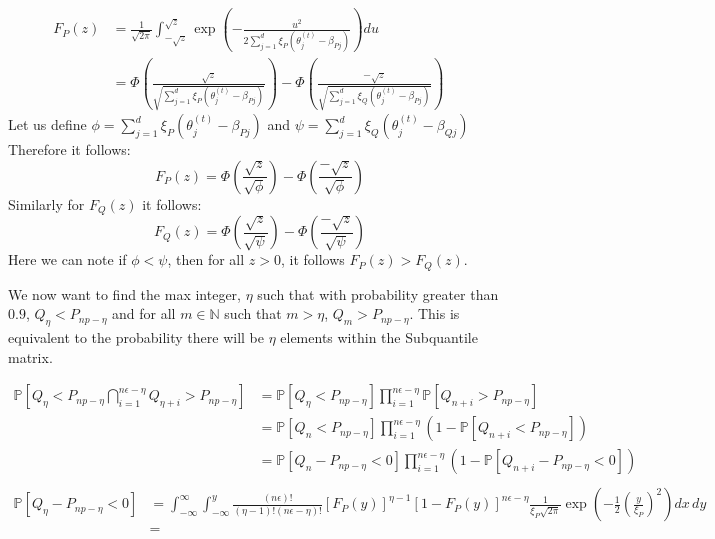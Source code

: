 \documentclass{article} %
\begin{document}
\begin{appendices}
	\begin{align}
		F_P(z) &= \frac{1}{\sqrt{2\pi}}\int_{-\sqrt{z}}^{\sqrt{z}}\exp\left(-\frac{u^2}{2\sum_{j=1}^d \xi_P\left(\theta_j^{(t)} - \beta_{Pj}\right)}\right)du &&\\
		&= \Phi\left(\frac{\sqrt{z}}{\sqrt{\sum_{j=1}^d \xi_P\left(\theta_j^{(t)}-\beta_{Pj}\right)}}\right) - \Phi\left(\frac{-\sqrt{z}}{\sqrt{\sum_{j=1}^d \xi_Q\left(\theta_j^{(t)}-\beta_{Pj}\right)}}\right) &&
	\end{align}
	Let us define $\displaystyle \phi = \sum_{j=1}^d \xi_P\left(\theta_j^{(t)} - \beta_{Pj}\right)$ and $\displaystyle \psi = \sum_{j=1}^d \xi_Q\left(\theta_j^{(t)} - \beta_{Qj}\right)$
	Therefore it follows:
	\begin{equation}
		F_P(z) = \Phi\left(\frac{\sqrt{z}}{\sqrt{\phi}}\right) - \Phi\left(\frac{-\sqrt{z}}{\sqrt{\phi}}\right)
	\end{equation}
	Similarly for $F_Q(z)$ it follows:
	\begin{equation}
		F_Q(z) = \Phi\left(\frac{\sqrt{z}}{\sqrt{\psi}}\right) - \Phi\left(\frac{-\sqrt{z}}{\sqrt{\psi}}\right)
	\end{equation}
	Here we can note if $\phi < \psi$, then for all $z > 0$, it follows $F_P(z) > F_Q(z)$.
	
	We now want to find the max integer, $\eta$ such that with probability greater than $0.9$, $Q_{\eta} < P_{np - \eta}$ and for all $m \in \mathbb{N}$ such that $m > \eta$, $Q_{m} > P_{np - \eta}$. This is equivalent to the probability there will be $\eta$ elements within the Subquantile matrix.

	\begin{align*}
		\mathbb{P}\left[Q_\eta < P_{np - \eta} \bigcap_{i=1}^{n\epsilon - \eta} Q_{\eta+ i} > P_{np - \eta}\right] &= \mathbb{P}\left[Q_\eta < P_{np - \eta}\right] \prod_{i=1}^{n\epsilon - \eta} \mathbb{P}\left[Q_{n+i} > P_{np - \eta}\right] &&\\
		&= \mathbb{P}\left[Q_n < P_{np - \eta}\right]\prod_{i=1}^{n\epsilon - \eta}\left(1 - \mathbb{P}\left[Q_{n+i} < P_{np - \eta}\right]\right) &&\\
		&= \mathbb{P}\left[Q_n - P_{np-\eta} < 0\right]\prod_{i=1}^{n\epsilon - \eta} \left(1 - \mathbb{P}\left[Q_{n+i} - P_{np-\eta} < 0\right]\right) &&\\
	\end{align*}
	\begin{align*}
		\mathbb{P}\left[Q_\eta - P_{np-\eta} < 0 \right]&= \int_{-\infty}^\infty \int_{-\infty}^y \frac{(n\epsilon)!}{(\eta-1)!(n\epsilon - \eta)!}\left[F_P(y)\right]^{\eta-1}\left[1 - F_P(y)\right]^{n\epsilon - \eta}\frac{1}{\xi_P\sqrt{2\pi}}\exp\left(-\frac{1}{2}\left(\frac{y}{\xi_P}\right)^2\right) dx\,dy &&\\
		&= 
	\end{align*}


\end{appendices}
\end{document}
